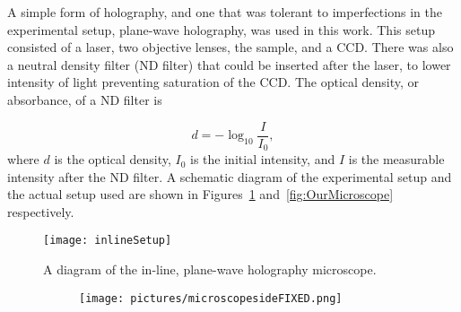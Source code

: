 A simple form of holography, and one that was tolerant to imperfections in the
experimental setup, plane-wave holography, was used in this work. This
setup consisted of a laser, two objective lenses, the sample, and a CCD\@. There was
also a neutral density filter (ND filter) that could be inserted after the
laser, to lower
intensity of light 
preventing saturation of the CCD\@.
The optical density, or absorbance, of a ND filter is

\begin{equation}
    d = -\log_{10}\frac{I}{I_0},
    \label{eq:ND}
\end{equation}
where $d$ is the optical density, $I_0$ is the initial intensity, and $I$ is
the measurable intensity after the ND filter.
A schematic diagram of
the experimental setup and the actual setup used are shown in Figures~\ref{fig:inlineSetup}
and~\ref{fig:OurMicroscope} respectively.



\begin{figure}[htbp!]
    \begin{center}
        \texttt{[image: inlineSetup]}
    \end{center}
    \caption{A diagram of the in-line, plane-wave holography microscope.}
    \label{fig:inlineSetup}
\end{figure}


\begin{figure}[ht!]
    \begin{center}

        \begin{subfigure}[t]{\textwidth}
            \label{fig:OurMicroscopeSide}
            \texttt{[image: pictures/microscopesideFIXED.png]}
            \caption{}
        \end{subfigure}
%

    \end{center}
\end{figure}

